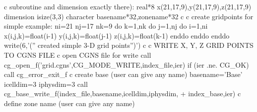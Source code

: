 \documentclass[12pt]{article}
\begin{document}
{\newline c   subroutine and dimension exactly there):
\newline\indent      real*8 x(21,17,9),y(21,17,9),z(21,17,9)
\newline\indent      dimension isize(3,3)
\newline\indent      character basename*32,zonename*32
\newline c
\newline c   create gridpoints for simple example:
\newline\indent      ni=21
\newline\indent      nj=17
\newline\indent      nk=9
\newline\indent      do k=1,nk
\newline\indent\indent        do j=1,nj
\newline\indent\indent\indent          do i=1,ni
\newline\indent\indent\indent\indent            x(i,j,k)=float(i-1)
\newline\indent\indent\indent\indent            y(i,j,k)=float(j-1)
\newline\indent\indent\indent\indent            z(i,j,k)=float(k-1)
\newline\indent\indent\indent          enddo
\newline\indent\indent        enddo
\newline\indent      enddo
\newline\indent      write(6,'('' created simple 3-D grid points'')')
\newline c
\newline c  WRITE X, Y, Z GRID POINTS TO CGNS FILE
\newline c  open CGNS file for write
\newline\indent      call cg\_open\_f('grid.cgns',CG\_MODE\_WRITE,index\_file,ier)
\newline\indent      if (ier .ne. CG\_OK) call cg\_error\_exit\_f
\newline c  create base (user can give any name)
\newline\indent      basename='Base'
\newline\indent      icelldim=3
\newline\indent      iphysdim=3
\newline\indent      call cg\_base\_write\_f(index\_file,basename,icelldim,iphysdim,
\newline + \indent index\_base,ier)
\newline c  define zone name (user can give any name)
}
\end{document}
